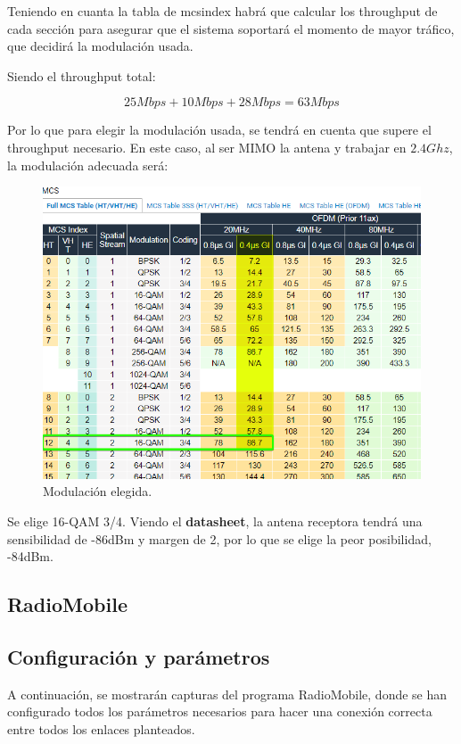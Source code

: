 \documentclass{article}
\begin{document}
Teniendo en cuanta la tabla de mcsindex habrá que calcular los throughput de cada sección para asegurar que el sistema soportará el momento de mayor tráfico, que decidirá la modulación usada. 

Siendo el throughput total:

$$25Mbps + 10Mbps + 28Mbps = 63Mbps$$

Por lo que para elegir la modulación usada, se tendrá en cuenta que supere el throughput necesario. En este caso, al ser MIMO la antena y trabajar en $2.4Ghz$, la modulación adecuada será:

\begin{figure}[ht]
    \centering
    \includegraphics[width=0.8
    \linewidth]{src/mcsindex.png}
    \caption{\label{fig:mcsindex} Modulación elegida.}
\end{figure}

Se elige 16-QAM 3/4. Viendo el \textbf{datasheet}, la antena receptora tendrá una sensibilidad de -86dBm y margen de 2, por lo que se elige la peor posibilidad, -84dBm.

\subsection{RadioMobile}

\subsection{Configuración y parámetros}

A continuación, se mostrarán capturas del programa RadioMobile, donde se han configurado todos los parámetros necesarios para hacer una conexión correcta entre todos los enlaces planteados. 

\quad
\end{document}
